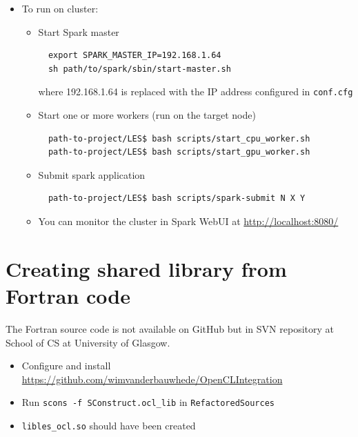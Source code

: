 \documentclass{l4proj}
\begin{document}
\begin{appendices}
\begin{itemize}
\item To run on cluster:
  \begin{itemize}
  \item Start Spark master
  \begin{verbatim}
  export SPARK_MASTER_IP=192.168.1.64
  sh path/to/spark/sbin/start-master.sh
  \end{verbatim}
  where 192.168.1.64 is replaced with the IP address configured in \texttt{conf.cfg}
  \item Start one or more workers (run on the target node)
  \begin{verbatim}
  path-to-project/LES$ bash scripts/start_cpu_worker.sh
  path-to-project/LES$ bash scripts/start_gpu_worker.sh
  \end{verbatim}
  \item Submit spark application
  \begin{verbatim}
  path-to-project/LES$ bash scripts/spark-submit N X Y
  \end{verbatim}
  \item You can monitor the cluster in Spark WebUI at \url{http://localhost:8080/}
  \end{itemize}

\end{itemize}

\section{Creating shared library from Fortran code}

The Fortran source code is not available on GitHub but in SVN repository at School of CS at University of Glasgow.

\begin{itemize}
\item Configure and install \url{https://github.com/wimvanderbauwhede/OpenCLIntegration}
\item Run \texttt{scons -f SConstruct.ocl\_lib} in \texttt{RefactoredSources}
\item \texttt{libles\_ocl.so} should have been created
\end{itemize}

\end{appendices}



  

\end{document}
